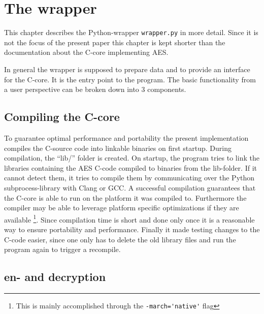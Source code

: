 \hypertarget{the-wrapper}{%
\section{The wrapper}\label{the-wrapper}}

This chapter describes the Python-wrapper \lstinline|wrapper.py| in more detail.
Since it is not the focus of the present paper this chapter is kept
shorter than the documentation about the C-core implementing AES.

In general the wrapper is supposed to prepare data and to provide an
interface for the C-core. It is the entry point to the program. The
basic functionality from a user perspective can be broken down into 3
components.

\hypertarget{compiling-the-c-core}{%
\subsection{Compiling the C-core}\label{compiling-the-c-core}}

To guarantee optimal performance and portability the present
implementation compiles the C-source code into linkable binaries on
first startup. During compilation, the \enquote{lib/} folder is created.
On startup, the program tries to link the libraries containing the AES
C-code compiled to binaries from the lib-folder. If it cannot detect
them, it tries to compile them by communicating over the Python
subprocess-library with Clang or GCC. A successful compilation
guarantees that the C-core is able to run on the platform it was
compiled to. Furthermore the compiler may be able to leverage platform
specific optimizations if they are available \footnote{This is mainly accomplished through the \lstinline{-march='native'} flag}. Since compilation time is
short and done only once it is a reasonable way to ensure portability
and performance. Finally it made testing changes to the C-code easier,
since one only has to delete the old library files and run the program
again to trigger a recompile.

\hypertarget{En--and-Decryption}{%
\subsection{en- and decryption}\label{en--and-decryption}}


